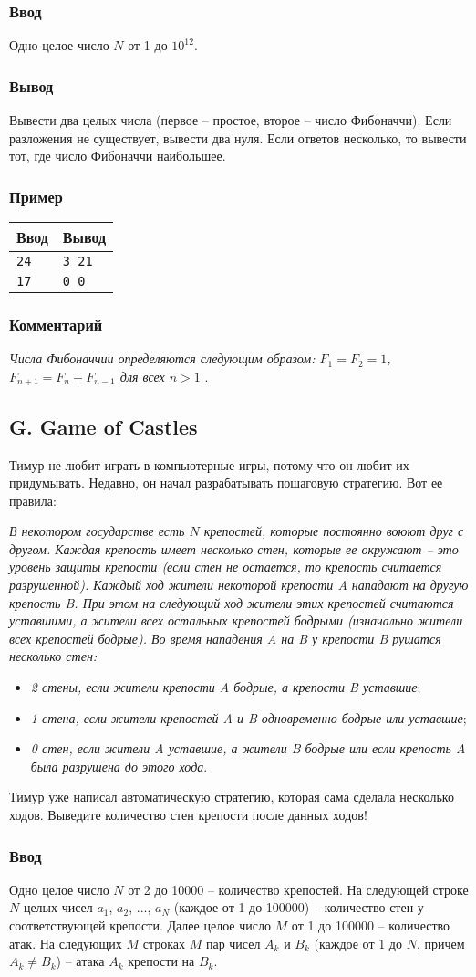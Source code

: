 \documentclass[10pt, a4paper]{article}
\newcommand{\informat}[1]
{
	\subsubsection*{Ввод} #1
}
\newcommand{\outformat}[1]
{
	\subsubsection*{Вывод} #1
}
\newcommand{\examplee}[4]
{
	\subsubsection*{Пример}
	\noindent
	\begin{center}
	\begin{tabularx}{\linewidth}{|X|X|}
	\hline
	Ввод 	& Вывод  	\\
	\hline
	{\tt #1} & {\tt #2}	\\
	\hline
	{\tt #3} & {\tt #4}	\\
	\hline
	\end{tabularx}
	\end{center}
}
\newcommand{\excomm}[1]
{
	\subsubsection*{Комментарий}
	\textit{#1}
}
\begin{document}
\informat{Одно целое число $N$ от 1 до $10^{12}$.}

\outformat{Вывести два целых числа (первое -- простое, второе -- число Фибоначчи). Если разложения не существует, вывести два нуля. Если ответов несколько, то вывести тот, где число Фибоначчи наибольшее.}

\examplee{24}{3 21}{17}{0 0}

\excomm{Числа Фибоначчии определяются следующим образом: $F_1 = F_2 = 1$, $F_{n+1} = F_n + F_{n-1}$ для всех $n > 1$}.



\subsection*{G. Game of Castles}

Тимур не любит играть в компьютерные игры, потому что он любит их придумывать. Недавно, он начал разрабатывать пошаговую стратегию. Вот ее правила:

\textit{В некотором государстве есть $N$ крепостей, которые постоянно воюют друг с другом. Каждая крепость имеет несколько стен, которые ее окружают -- это уровень защиты крепости (если стен не остается, то крепость считается разрушенной). Каждый ход жители некоторой крепости A нападают на другую крепость B. При этом на следующий ход жители этих крепостей считаются уставшими, а жители всех остальных крепостей бодрыми (изначально жители всех крепостей бодрые). Во время нападения A на B у крепости B рушатся несколько стен:}
\begin{itemize}
\item \textit{2 стены, если жители крепости A бодрые, а крепости B уставшие};
\item \textit{1 стена, если жители крепостей A и B одновременно бодрые или уставшие};
\item \textit{0 стен, если жители A  уставшие, а жители B  бодрые или если крепость A была разрушена до этого хода}.
\end{itemize}

Тимур уже написал автоматическую стратегию, которая сама сделала несколько ходов. Выведите количество стен крепости после данных ходов!

\informat{Одно целое число $N$ от 2 до 10000 -- количество крепостей. На следующей строке $N$ целых чисел $a_1$, $a_2$, ..., $a_N$ (каждое от 1 до 100000) -- количество стен у соответствующей крепости. Далее целое число $M$ от 1 до 100000 -- количество атак. На следующих $M$ строках $M$ пар чисел $A_k$ и $B_k$ (каждое от 1 до $N$, причем $A_k \neq B_k$) -- атака $A_k$ крепости на $B_k$.}
\end{document}
